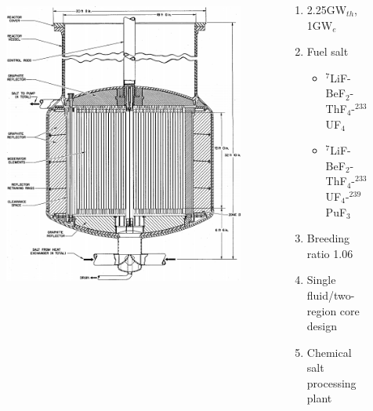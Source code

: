 \begin{frame}
\begin{columns}
\begin{figure}[t]
                \includegraphics[height=0.7\textwidth]{./images/msbr_plain.png}
                \vspace*{-0.2in}
      \end{figure}
   \begin{block}{ \cite{robertson_conceptual_1971}}
       \begin{enumerate}
       \item 2.25GW$_{th}$, 1GW$_e$
       \item Fuel salt
         \begin{itemize}
         \item $^7$LiF-BeF$_2$-ThF$_4$-$^{233}$UF$_4$
         \item $^7$LiF-BeF$_2$-ThF$_4$-$^{233}$UF$_4$-$^{239}$PuF$_3$
         \end{itemize}  
       \item Breeding ratio 1.06
       \item Single fluid/two-region core design
       \item Chemical salt processing plant
      \end{enumerate}
     \end{block}
  \end{columns}
              
 \end{frame}

